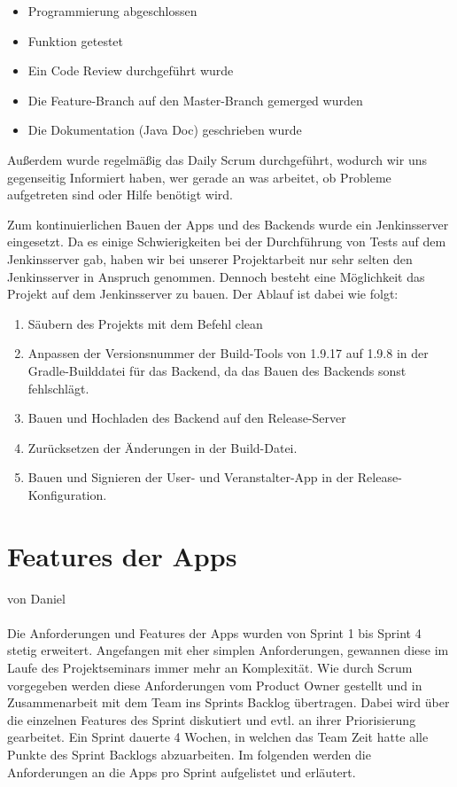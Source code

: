 \documentclass[a4paper, titlepage]{scrartcl}
\newcommand{\AUTHOR}[1]{
	von #1 \\ \\
}
\begin{document}
\begin{itemize}
	\item Programmierung abgeschlossen
	\item Funktion getestet
	\item Ein Code Review durchgeführt wurde
	\item Die Feature-Branch auf den Master-Branch gemerged wurden
	\item Die Dokumentation (Java Doc) geschrieben wurde
\end{itemize}

Außerdem wurde regelmäßig das Daily Scrum durchgeführt, wodurch wir uns gegenseitig Informiert haben, wer gerade an was arbeitet, ob Probleme aufgetreten sind oder Hilfe benötigt wird.

Zum kontinuierlichen Bauen der Apps und des Backends wurde ein Jenkinsserver eingesetzt. Da es einige Schwierigkeiten bei der Durchführung von Tests auf dem Jenkinsserver gab, haben wir bei unserer Projektarbeit nur sehr selten den Jenkinsserver in Anspruch genommen. Dennoch besteht eine Möglichkeit das Projekt auf dem Jenkinsserver zu bauen. Der Ablauf ist dabei wie folgt:

\begin{enumerate}
	\item Säubern des Projekts mit dem Befehl \glqq clean\grqq
	\item Anpassen der Versionsnummer der Build-Tools von 1.9.17 auf 1.9.8 in der Gradle-Builddatei für das Backend, da das Bauen des Backends sonst fehlschlägt.
	\item Bauen und Hochladen des Backend auf den Release-Server
	\item Zurücksetzen der Änderungen in der Build-Datei.
	\item Bauen und Signieren der User- und Veranstalter-App in der Release-Konfiguration.
\end{enumerate}

\section{Features der Apps}
\AUTHOR{Daniel}

Die Anforderungen und Features der Apps wurden von Sprint 1 bis Sprint 4 stetig erweitert. Angefangen mit eher simplen Anforderungen, gewannen diese im Laufe des Projektseminars immer mehr an Komplexität. Wie durch Scrum vorgegeben werden diese Anforderungen vom Product Owner gestellt und in Zusammenarbeit mit dem Team ins Sprints Backlog übertragen. Dabei wird über die einzelnen Features des Sprint diskutiert und evtl. an ihrer Priorisierung gearbeitet. Ein Sprint dauerte 4 Wochen, in welchen das Team Zeit hatte alle Punkte des Sprint Backlogs abzuarbeiten. Im folgenden werden die Anforderungen an die Apps pro Sprint aufgelistet und erläutert.
\end{document}
